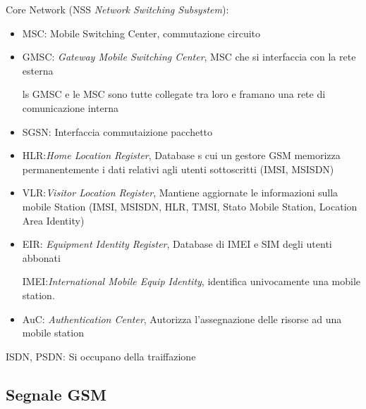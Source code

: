 \documentclass{article}
\begin{document}
Core Network (NSS \textit{Network Switching Subsystem}):
\begin{itemize}
    \item MSC: Mobile Switching Center, commutazione circuito
    \item GMSC: \textit{Gateway Mobile Switching Center}, MSC che si interfaccia con la rete esterna

            ls GMSC e le MSC sono tutte collegate tra loro e framano una rete di comunicazione interna
    \item SGSN: Interfaccia commutaizione pacchetto
    \item HLR:\@\textit{Home Location Register}, Database s cui un gestore GSM memorizza permanentemente i dati relativi agli utenti sottoscritti (IMSI, MSISDN)

    \item VLR:\@\textit{Visitor Location Register}, Mantiene aggiornate le informazioni sulla mobile Station (IMSI, MSISDN, HLR, TMSI, Stato Mobile Station, Location Area Identity)
    \item EIR: \textit{Equipment Identity Register}, Database di IMEI e SIM degli utenti abbonati

    IMEI:\@\textit{International Mobile Equip Identity}, identifica univocamente una mobile station.

    \item AuC: \textit{Authentication Center}, Autorizza l'assegnazione delle risorse ad una mobile station
\end{itemize}

ISDN, PSDN: Si occupano della traiffazione

\subsection{Segnale GSM}
\end{document}
